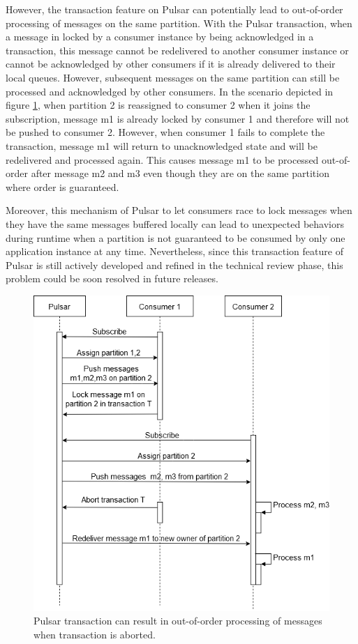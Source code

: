 However, the transaction feature on Pulsar can potentially lead to out-of-order processing of messages on the same partition. With the Pulsar transaction, when a message in locked by a consumer instance by being acknowledged in a transaction, this message cannot be redelivered to another consumer instance or cannot be acknowledged by other consumers if it is already delivered to their local queues. However, subsequent messages on the same partition can still be processed and acknowledged by other consumers. In the scenario depicted in figure \ref{fig:pulsaroutofordertransaction}, when partition 2 is reassigned to consumer 2 when it joins the subscription, message m1 is already locked by consumer 1 and therefore will not be pushed to consumer 2. However, when consumer 1 fails to complete the transaction, message m1 will return to unacknowledged state and will be redelivered and processed again. This causes message m1 to be processed out-of-order after message m2 and m3 even though they are on the same partition where order is guaranteed.

Moreover, this mechanism of Pulsar to let consumers race to lock messages when they have the same messages buffered locally can lead to unexpected behaviors during runtime when a partition is not guaranteed to be consumed by only one application instance at any time. Nevertheless, since this transaction feature of Pulsar is still actively developed and refined in the technical review phase, this problem could be soon resolved in future releases. 

\newpage
\begin{figure}[h]
	\centering
	\includegraphics[width=12cm]{images/pulsar-transaction-out-of-order.png}
	\caption{Pulsar transaction can result in out-of-order processing of messages when transaction is aborted.}
	\label{fig:pulsaroutofordertransaction}
\end{figure}

